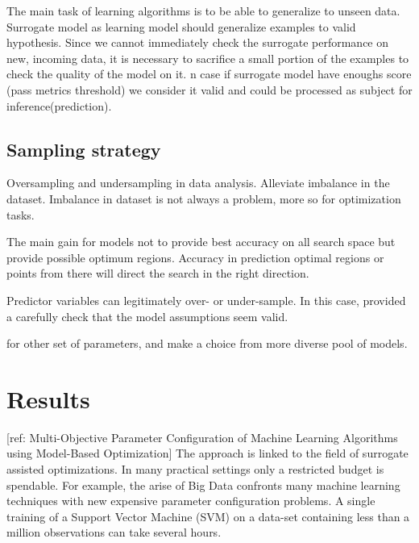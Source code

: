     The main task of learning algorithms is to be able to generalize to unseen data. Surrogate model as learning model should generalize examples to valid hypothesis. 
    Since we cannot immediately check the surrogate performance on new, incoming data, it is necessary to sacrifice a small portion of the examples to check the quality of the model on it.
    n case if surrogate model have enoughs score (pass metrics threshold) we consider it valid and could be processed as subject for inference(prediction).

    \subsection{Sampling strategy}
    Oversampling and undersampling in data analysis. Alleviate imbalance in the dataset. 
    Imbalance in dataset is not always a problem, more so for optimization tasks. 

    The main gain for models not to provide best accuracy on all search space but provide possible optimum regions.
    Accuracy in prediction optimal regions or points from there will direct the search in the right direction.

    Predictor variables can legitimately over- or under-sample. 
    In this case, provided a carefully check that the model assumptions seem valid.


    for other set of parameters, and make a choice from more diverse pool of models.








\section{Results}

[ref: Multi-Objective Parameter Configuration of Machine Learning Algorithms using Model-Based Optimization]
The approach is linked to the field of surrogate assisted optimizations. In many practical settings only a restricted budget is spendable. For example, the arise of Big Data confronts many machine learning techniques with new expensive parameter configuration problems. A single training of a Support Vector Machine (SVM) on a data-set containing less than a million observations can take several hours.